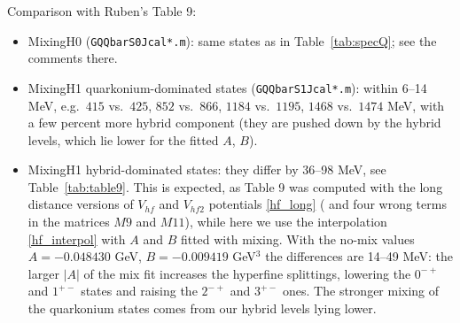 \documentclass[11pt, a4paper]{article}
\begin{document}
Comparison with Ruben's Table 9:
\begin{itemize}
    \item MixingH0 (\texttt{GQQbarS0Jcal*.m}): same states as in Table~\ref{tab:specQ}; see the comments there.
    \item MixingH1 quarkonium-dominated states (\texttt{GQQbarS1Jcal*.m}): within 6--14 MeV, e.g.\ $415$ vs.\ $425$, $852$ vs.\ $866$, $1184$ vs.\ $1195$, $1468$ vs.\ $1474$ MeV, with a few percent more hybrid component (they are pushed down by the hybrid levels, which lie lower for the fitted $A$, $B$).
    \item MixingH1 hybrid-dominated states: they differ by 36--98 MeV, see Table~\ref{tab:table9}. This is expected, as Table 9 was computed with the long distance versions of $V_{hf}$ and $V_{hf2}$ potentials \eqref{hf_long} {(\color{red} and four wrong terms in the matrices $M9$ and $M11$)}, while here we use the interpolation \eqref{hf_interpol} with $A$ and $B$ fitted with mixing. With the no-mix values $A=-0.048430$ GeV, $B=-0.009419$ GeV$^3$ the differences are 14--49 MeV: the larger $|A|$ of the mix fit increases the hyperfine splittings, lowering the $0^{-+}$ and $1^{+-}$ states and raising the $2^{-+}$ and $3^{+-}$ ones. The stronger mixing of the quarkonium states comes from our hybrid levels lying lower.
\end{itemize}
\end{document}
